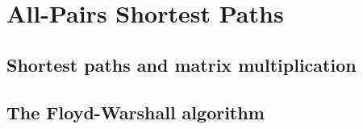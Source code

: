 \documentclass[letter]{book}
\theoremstyle{definition}
\theoremstyle{definition}
\theoremstyle{remark}
\begin{document}
\setcounter{chapter}{24}

\chapter{All-Pairs Shortest Paths}

\section{Shortest paths and matrix multiplication}


\section{The Floyd-Warshall algorithm}
\end{document}
